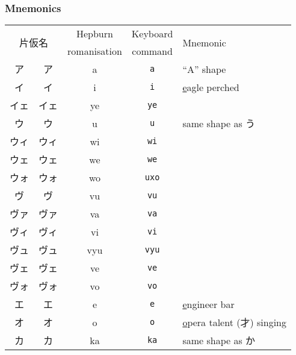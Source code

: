 \documentclass[../nihongo-gakushuu-kyouzai.tex]{subfiles}
\begin{document}
\subsubsection{Mnemonics}
\begin{longtable}[c]{@{}ccccl@{}}
    \toprule
    \multicolumn{2}{c}{\multirow{2}{*}{片仮名}} & Hepburn & Keyboard & \multirow{2}{*}{Mnemonic} \\
    \multicolumn{2}{c}{} & romanisation & command & \\* \midrule
    ア & {\sffamily ア} & a & \texttt{a} & ``A'' shape \\
    イ & {\sffamily イ} & i & \texttt{i} & \ul{e}agle perched \\
    \color{blue} イェ & \color{blue} {\sffamily イェ} & \color{blue} ye & \color{blue} \texttt{ye} & \\
    ウ & {\sffamily ウ} & u & \texttt{u} & same shape as う \\
    \color{blue} ウィ & \color{blue} {\sffamily ウィ} & \color{blue} wi & \color{blue} \texttt{wi} & \\
    \color{blue} ウェ & \color{blue} {\sffamily ウェ} & \color{blue} we & \color{blue} \texttt{we} & \\
    \color{blue} ウォ & \color{blue} {\sffamily ウォ} & \color{blue} wo & \color{red} \texttt{uxo} & \\
    \color{blue} ヴ & \color{blue} {\sffamily ヴ} & \color{blue} vu & \color{blue} \texttt{vu} & \\
    \color{blue} ヴァ & \color{blue} {\sffamily ヴァ} & \color{blue} va & \color{blue} \texttt{va} & \\
    \color{blue} ヴィ & \color{blue} {\sffamily ヴィ} & \color{blue} vi & \color{blue} \texttt{vi} & \\
    \color{blue} ヴュ & \color{blue} {\sffamily ヴュ} & \color{blue} vyu & \color{blue} \texttt{vyu} & \\
    \color{blue} ヴェ & \color{blue} {\sffamily ヴェ} & \color{blue} ve & \color{blue} \texttt{ve} & \\
    \color{blue} ヴォ & \color{blue} {\sffamily ヴォ} & \color{blue} vo & \color{blue} \texttt{vo} & \\
    エ & {\sffamily エ} & e & \texttt{e} & \ul{e}ngineer bar \\
    オ & {\sffamily オ} & o & \texttt{o} & \ul{o}pera talent (才) singing \\
    カ & {\sffamily カ} & ka & \texttt{ka} & same shape as か \\

\end{longtable}
\end{document}
